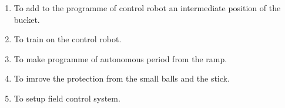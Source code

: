 \begin{enumerate}
\begin{enumerate}
		\item To add to the programme of control robot an intermediate position of the bucket.
		
		\item To train on the control robot.
		
        \item To make programme of autonomous period from the ramp.
        
        \item To imrove the protection from the small balls and the stick.
        
        \item To setup field control system.
			
	\end{enumerate}
\end{enumerate}
\fillpage
